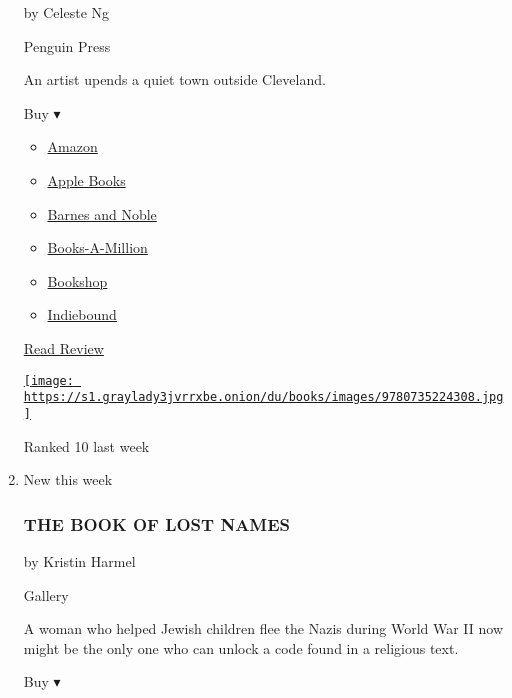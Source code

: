 \begin{enumerate}
  by Celeste Ng

  Penguin Press

  An artist upends a quiet town outside Cleveland.

  Buy ▾

  \begin{itemize}
  \tightlist
  \item
    \href{https://www.amazon.com/Little-Fires-Everywhere-Celeste-Ng-ebook/dp/B01N4VW75U?tag=NYTBS-20}{Amazon}
  \item
    \href{https://du-gae-books-dot-nyt-du-prd.appspot.com/buy?title=LITTLE+FIRES+EVERYWHERE\&author=Celeste+Ng}{Apple
    Books}
  \item
    \href{https://www.anrdoezrs.net/click-7990613-11819508?url=https\%3A\%2F\%2Fwww.barnesandnoble.com\%2Fw\%2F\%3Fean\%3D9780735224315}{Barnes
    and Noble}
  \item
    \href{https://www.anrdoezrs.net/click-7990613-35140?url=https\%3A\%2F\%2Fwww.booksamillion.com\%2Fp\%2FLITTLE\%2BFIRES\%2BEVERYWHERE\%2FCeleste\%2BNg\%2F9780735224315}{Books-A-Million}
  \item
    \href{https://bookshop.org/a/3546/9780735224315}{Bookshop}
  \item
    \href{https://www.indiebound.org/book/9780735224315?aff=NYT}{Indiebound}
  \end{itemize}

  \href{https://www.nytimes3xbfgragh.onion/2017/09/25/books/review/little-fires-everywhere-celeste-ng.html}{Read
  Review}

  \href{https://www.nytimes3xbfgragh.onion/2017/09/25/books/review/little-fires-everywhere-celeste-ng.html}{\texttt{[image: https://s1.graylady3jvrrxbe.onion/du/books/images/9780735224308.jpg]}}

  Ranked 10 last week
\item
  New this week

  \hypertarget{the-book-of-lost-names}{%
  \subsubsection{THE BOOK OF LOST NAMES}\label{the-book-of-lost-names}}

  by Kristin Harmel

  Gallery

  A woman who helped Jewish children flee the Nazis during World War II
  now might be the only one who can unlock a code found in a religious
  text.

  Buy ▾


\end{enumerate}
